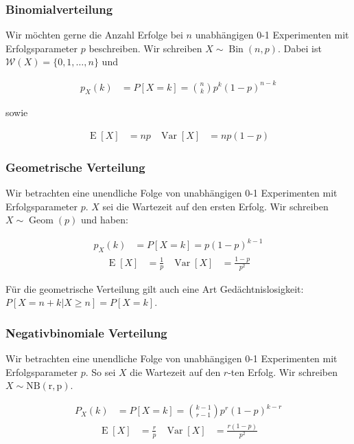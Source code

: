 \documentclass[25pt]{sciposter}
\newcommand{\W}{\mathcal{W}}
\newcommand{\Var}{\operatorname{Var}}
\newcommand{\E}{\operatorname{E}}
\begin{document}
\begin{multicols}{3}
		\subsubsection*{Binomialverteilung}
		Wir möchten gerne die Anzahl Erfolge bei $n$ unabhängigen 0-1 Experimenten mit Erfolgsparameter $p$ beschreiben. Wir schreiben $X \sim \operatorname{Bin}(n,p)$. Dabei ist $\W(X) = \{0,1,\ldots,n\}$ und 
		
		\begin{align*}
			p_X(k) &= P[X=k] = {n \choose k} p^k (1-p)^{n-k}
		\end{align*}
		
		sowie 
		
		\begin{align*}
			\E[X] &= np & \Var[X] &= np(1-p)
		\end{align*}
		
		
		\subsubsection*{Geometrische Verteilung}
		Wir betrachten eine unendliche Folge von unabhängigen 0-1 Experimenten mit Erfolgsparameter $p$. $X$ sei die Wartezeit auf den ersten Erfolg. Wir schreiben $X\sim\operatorname{Geom}(p)$ und haben:
		
		\begin{align*}
			p_X(k) &= P[X=k] = p(1-p)^{k-1}
		\end{align*}
		\begin{align*}
			\E[X] &= \frac{1}{p} & \Var[X] &= \frac{1-p}{p^2}
		\end{align*}
		
		Für die geometrische Verteilung gilt auch eine Art Gedächtnislosigkeit: $P[X = n+k | X \geq n ] = P[X = k]$.
		
		\subsubsection*{Negativbinomiale Verteilung}
		Wir betrachten eine unendliche Folge von unabhängigen 0-1 Experimenten mit Erfolgsparameter $p$. So sei $X$ die Wartezeit auf den $r$-ten Erfolg. Wir schreiben $X\sim \operatorname{NB(r,p)}$.
		
		\begin{align*}
			P_X(k) &= P[X = k] = {k-1 \choose r-1} p^r(1-p)^{k-r}
		\end{align*}
		\begin{align*}
			\E[X] &= \frac{r}{p} & \Var[X] &= \frac{r(1-p)}{p^2}
		\end{align*}
		

\end{multicols}
\end{document}
